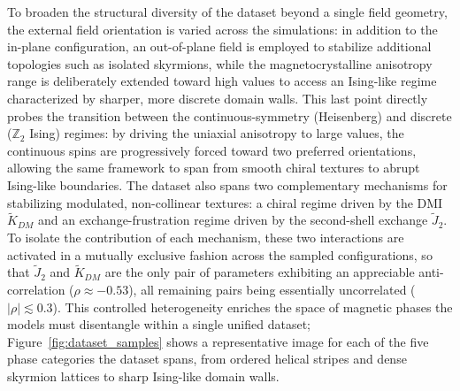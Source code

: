 \documentclass[letterpaper, 12, one column]{article}
\begin{document}
To broaden the structural diversity of the dataset beyond a single field geometry, the external field orientation is varied across the simulations: in addition to the in-plane configuration, an out-of-plane field is employed to stabilize additional topologies such as isolated skyrmions, while the magnetocrystalline anisotropy range is deliberately extended toward high values to access an Ising-like regime characterized by sharper, more discrete domain walls. This last point directly probes the transition between the continuous-symmetry (Heisenberg) and discrete ($\mathbb{Z}_2$ Ising) regimes: by driving the uniaxial anisotropy to large values, the continuous spins are progressively forced toward two preferred orientations, allowing the same framework to span from smooth chiral textures to abrupt Ising-like boundaries. The dataset also spans two complementary mechanisms for stabilizing modulated, non-collinear textures: a chiral regime driven by the DMI $\tilde{K}_{DM}$ and an exchange-frustration regime driven by the second-shell exchange $\tilde{J}_2$. To isolate the contribution of each mechanism, these two interactions are activated in a mutually exclusive fashion across the sampled configurations, so that $\tilde{J}_2$ and $\tilde{K}_{DM}$ are the only pair of parameters exhibiting an appreciable anti-correlation ($\rho \approx -0.53$), all remaining pairs being essentially uncorrelated ($|\rho| \lesssim 0.3$). This controlled heterogeneity enriches the space of magnetic phases the models must disentangle within a single unified dataset; Figure~\ref{fig:dataset_samples} shows a representative image for each of the five phase categories the dataset spans, from ordered helical stripes and dense skyrmion lattices to sharp Ising-like domain walls.
\end{document}
